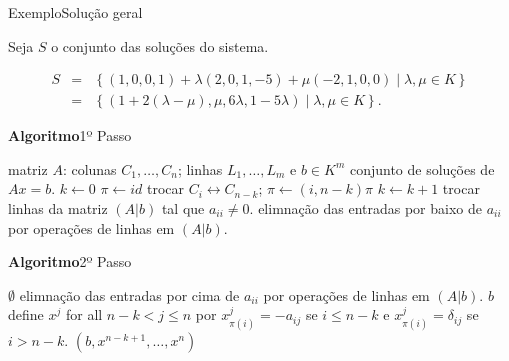 \documentclass{beamer}
\begin{document}
\begin{frame}{Exemplo}{Solução geral}

Seja $S$ o conjunto das soluções do sistema.

\begin{eqnarray*}
S&=& \left \{(1,0,0,1) + \lambda (2,0,1,-5) + \mu (-2,1,0,0) \mid \lambda,\mu \in K\right\}\\
&=& \left \{  (1+2(\lambda-\mu), \mu, 6\lambda, 1-5\lambda) \mid \lambda,\mu \in K\right\}.
\end{eqnarray*}



\end{frame}

\begin{frame}[fragile]{\bf Algoritmo}{1º Passo}
\begin{algorithmic}
\REQUIRE matriz $A$: colunas $C_1, \ldots, C_n$; linhas $L_1, \ldots, L_m$ e $b \in K^m$
\ENSURE conjunto de soluções de $Ax=b$.
  \STATE $k \leftarrow 0$
  \STATE $\pi\leftarrow id$
				\STATE trocar $C_i \leftrightarrow C_{n-k}$; $\pi \leftarrow (i, n-k)\pi $
				\STATE $k\leftarrow k+1$
			 \ELSE
			 	\STATE trocar linhas da matriz $(A|b)$ tal que $a_{ii}\neq 0$.
				\STATE elimnação das entradas por baixo de $a_{ii}$ por operações de linhas em $(A|b)$.
			\ENDIF
   \ENDFOR
\end{algorithmic}
\end{frame}

\begin{frame}[fragile]{\bf Algoritmo}{2º Passo}
\begin{algorithmic}
  	\RETURN $\emptyset$
  \ELSE
				\STATE elimnação das entradas por cima de $a_{ii}$ por operações de linhas em $(A|b)$.
   \ENDFOR
  	\RETURN $b$
    \ELSE 
    	  \STATE define $x^j$ for all $n-k<j\leq n$ por $x^j_{\pi(i)}=-a_{ij}$ se $i\leq n-k$ e $x^j_{\pi(i)} = \delta_{ij}$ se $i>n-k$.
	  \RETURN $(b, x^{n-k+1}, \ldots, x^n)$
    \ENDIF
  \ENDIF
\end{algorithmic}
\end{frame}
\end{document}

